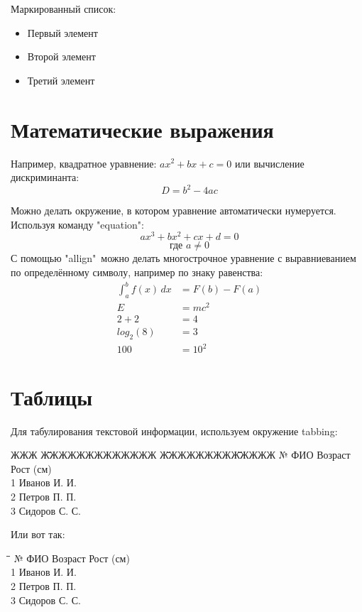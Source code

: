     Маркированный список:
    \begin{itemize}
        \item Первый элемент
        \item Второй элемент
        \item Третий элемент
    \end{itemize}

\section{Математические выражения}
    Например, квадратное уравнение: $ax^2 + bx+ c = 0$ или вычисление дискриминанта:
    \[D=b^2-4ac\]

    Можно делать окружение, в котором уравнение автоматически нумеруется. Используя команду "equation":
    \begin{equation}
        ax^3 + bx^2+cx+d=0
    \end{equation}
    \label{eq:triple}
    \begin{equation}
        \text{где } a \neq 0
    \end{equation}
    С помощью "allign"\ можно делать многострочное уравнение с выравниеванием по определённому символу, например по знаку равенства:
    \begin{align}
        \int_a^b f(x) \, dx &= F(b) - F(a) \\
        E &= mc^2 \\
        2 + 2 &= 4 \\
        log_{2}(8) &= 3 \\
        100 &= 10^2
    \end{align}

\section{Таблицы}
    Для табулирования текстовой информации, используем  окружение tabbing:

    \begin{tabbing}
        ЖЖЖ \= ЖЖЖЖЖЖЖЖЖЖЖЖЖ \= ЖЖЖЖЖЖЖЖ\= ЖЖЖЖЖ \kill
        № \>  ФИО \>  Возраст \>  Рост (см) \\
        1 \> Иванов И. И.   \\
        2 \> Петров П. П.  \\
        3 \> Сидоров С. С.  
    \end{tabbing}

    Или вот так:

    \begin{tabbing}
        \hspace{3em}\= \hspace{12em}\= \hspace{6em}\= \hspace{6em}\kill
        № \>  ФИО \>  Возраст \>  Рост (см) \\
        1 \> Иванов И. И.   \\
        2 \> Петров П. П.  \\
        3 \> Сидоров С. С.  
    \end{tabbing}

